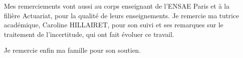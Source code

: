 
Mes remerciements vont aussi au corps enseignant de l'ENSAE Paris et à la filière Actuariat,
pour la qualité de leurs enseignements. Je remercie ma tutrice académique, Caroline HILLAIRET,
pour son suivi et ses remarques sur le traitement de l'incertitude, qui ont fait évoluer ce travail.

Je remercie enfin ma famille pour son soutien.

\clearpage
